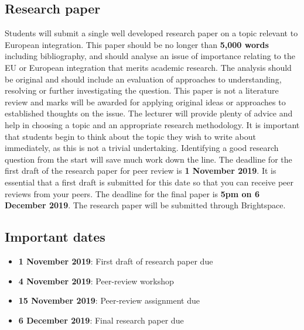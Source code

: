 \subsection*{Research paper}

	Students will submit a single well developed research paper on a topic relevant to European integration. This paper should be no longer than \textbf{5,000 words} including bibliography, and should analyse an issue of importance relating to the EU or European integration that  merits academic research. The analysis should be original and should include an evaluation of approaches to understanding, resolving or further investigating the question. This paper is not a literature review and marks will be awarded for applying original ideas or approaches to established thoughts on the issue. The lecturer will provide plenty of advice and help in choosing a topic and an appropriate research methodology. It is important that students begin to think about the topic they wish to write about immediately, as this is not a trivial undertaking. Identifying a good research question from the start will save much work down the line. The deadline for the first draft of the research paper for peer review is \textbf{1 November 2019}. It is essential that a first draft is submitted for this date so that you can receive peer reviews from your peers. The deadline for the final paper is \textbf{5pm on 6 December 2019}. The research paper will be submitted through Brightspace.

\subsection*{Important dates}

\begin{itemize}
	\item \textbf{1 November 2019}: First draft of research paper due
	\item \textbf{4 November 2019}: Peer-review workshop
	\item \textbf{15 November 2019}: Peer-review assignment due
	\item \textbf{6 December 2019}: Final research paper due
\end{itemize}
